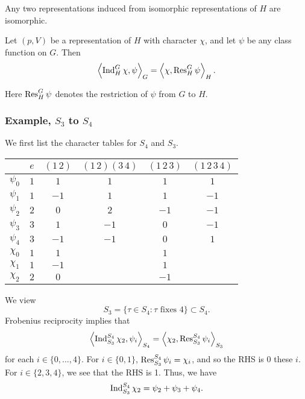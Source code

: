 \begin{corollary}
    Any two representations induced from isomorphic representations of $H$ are isomorphic.
\end{corollary}

\begin{corollary}
    Let $(p, V)$ be a representation of $H$ with character $\chi$, and let $\psi$ be any class function on $G$. Then
    \[
        \left\langle
        \operatorname{Ind}_H^G \chi, \psi
        \right\rangle_G
        =
        \left\langle
        \chi, \operatorname{Res}_H^G \psi
        \right\rangle_H.
    \]
\end{corollary}
Here $\operatorname{Res}_H^G\psi$ denotes the restriction of $\psi$ from $G$ to $H$.

\subsubsection{Example, $S_3$ to $S_4$}

\begin{example}
    We first list the character tables for $S_4$ and $S_3$.
    \begin{center}
        \begin{tabular}{cccccc}
            \toprule
                     & $e$            & $(1\,2)$ & $(1\,2)(3\,4)$ & $(1\,2
            \,3)$    & $(1\,2\,3\,4)$                                             \\
            \midrule
            $\psi_0$ & $1$            & $1$      & $1$            & $1$    & $1$  \\
            $\psi_1$ & $1$            & $-1$     & $1$            & $1$    & $-1$ \\
            $\psi_2$ & $2$            & $0$      & $2$            & $-1$   & $-1$ \\
            $\psi_3$ & $3$            & $1$      & $-1$           & $0$    & $-1$ \\
            $\psi_4$ & $3$            & $-1$     & $-1$           & $0$    & $1$  \\
            \midrule
            $\chi_0$ & $1$            & $1$      &                & $1$           \\
            $\chi_1$ & $1$            & $-1$     &                & $1$           \\
            $\chi_2$ & $2$            & $0$      &                & $-1$          \\
            \bottomrule
        \end{tabular}
    \end{center}
    We view
    \[ S_3 = \{\tau \in S_4: \text{$\tau$ fixes 4}\} \subset S_4. \]
    Frobenius reciprocity implies that
    \[
        \left\langle
        \operatorname{Ind}_{S_3}^{S_4} \chi_2, \psi_i
        \right\rangle_{S_4}
        =
        \left\langle
        \chi_2, \operatorname{Res}_{S_3}^{S_4} \psi_i
        \right\rangle_{S_3}
    \]
    for each $i \in \{0, \ldots, 4\}$. For $i \in \{0, 1\}$, $\operatorname{Res}^{S_4}_{S_3} \psi_i = \chi_i$, and so the RHS is 0 these $i$. For $i \in \{2,3,4\}$, we see that the RHS is 1. Thus, we have
    \[ \operatorname{Ind}_{S_3}^{S_4} \chi_2 = \psi_2 + \psi_3 + \psi_4. \]
\end{example}

